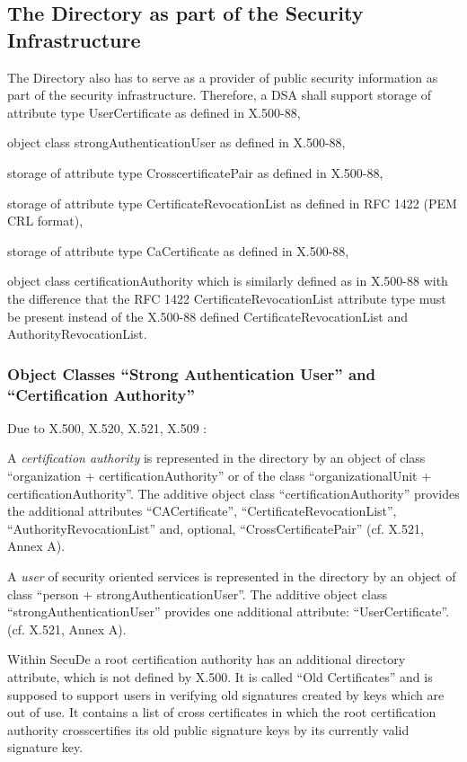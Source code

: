 \subsection{The Directory as part of the Security Infrastructure}

The Directory also has to serve as a provider of public security information as part 
of the security infrastructure. Therefore, a DSA shall support
\bi
\m storage of attribute type UserCertificate as defined in X.500-88,

\m object class strongAuthenticationUser as defined in X.500-88,

\m storage of attribute type CrosscertificatePair as defined in X.500-88,

\m storage of attribute type CertificateRevocationList as defined in RFC 1422 
  (PEM CRL format),

\m storage of attribute type CaCertificate as defined in X.500-88,

\m object class certificationAuthority which is similarly defined as in X.500-88
  with the difference that the RFC 1422 CertificateRevocationList
  attribute type must be present instead of the X.500-88 defined
  CertificateRevocationList and AuthorityRevocationList.
\ei

\subsubsection{Object Classes ``Strong Authentication User''
and ``Certification Authority''}
\label{ds-oc}

Due to X.500, X.520, X.521, X.509 \cite{cci3} \cite{cci4}:

A {\em certification authority} is represented in the directory
by an object of class ``organization + certi\-fica\-tion\-Au\-tho\-rity'' or
of the class ``organizational\-Unit + certi\-fica\-tion\-Au\-tho\-rity''.
The additive object class ``certification\-Au\-tho\-ri\-ty''
provides the additional attributes
``CACertificate'', ``Certi\-ficate\-Re\-vo\-cation\-List'',
``Autho\-rity\-Re\-vo\-cation\-List'' and, optional,
``Cross\-Certi\-ficate\-Pair'' (cf. X.521, Annex A).

A {\em user} of security oriented services is represented in the directory
by an object of class
``person + strongAuthenticationUser''.
The additive object class ``strong\-Authen\-tica\-tion\-User''
provides one additional attribute:
``UserCertificate''.
(cf. X.521, Annex A).

Within SecuDe a root certification authority
has an additional directory attribute, which is not defined by X.500.
It is called ``Old Certificates'' and is supposed to support users
in verifying old signatures
created by keys which are out of use.
It contains a list of cross certificates in which the root
certification authority crosscertifies its old public signature
keys by its currently valid signature key.

